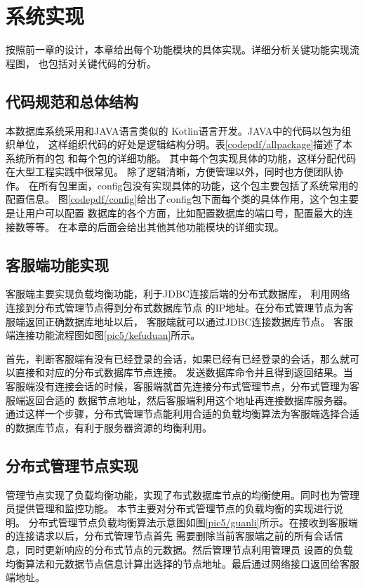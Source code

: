 
\chapter{系统实现}
按照前一章的设计，本章给出每个功能模块的具体实现。详细分析关键功能实现流程图，
也包括对关键代码的分析。
\section{代码规范和总体结构}
本数据库系统采用和JAVA语言类似的
Kotlin语言开发。JAVA中的代码以包为组织单位，
这样组织代码的好处是逻辑结构分明。表\ref{codepdf/allpackage}描述了本系统所有的包
和每个包的详细功能。
其中每个包实现具体的功能，这样分配代码在大型工程实践中很常见。
除了逻辑清晰，方便管理以外，同时也方便团队协作。
在所有包里面，config包没有实现具体的功能，这个包主要包括了系统常用的配置信息。
图\ref{codepdf/config}给出了config包下面每个类的具体作用，这个包主要是让用户可以配置
数据库的各个方面，比如配置数据库的端口号，配置最大的连接数等等。
在本章的后面会给出其他其他功能模块的详细实现。
\section{客服端功能实现}
客服端主要实现负载均衡功能，利于JDBC连接后端的分布式数据库，
利用网络连接到分布式管理节点得到分布式数据库节点
的IP地址。在分布式管理节点为客服端返回正确数据库地址以后，
客服端就可以通过JDBC连接数据库节点。
客服端连接功能流程图如图\ref{pic5/kefuduan}所示。

首先，判断客服端有没有已经登录的会话，如果已经有已经登录的会话，那么就可以直接和对应的分布式数据库节点连接。
发送数据库命令并且得到返回结果。当客服端没有连接会话的时候，客服端就首先连接分布式管理节点，分布式管理为客服端返回合适的
数据节点地址，然后客服端利用这个地址再连接数据库服务器。
通过这样一个步骤，分布式管理节点能利用合适的负载均衡算法为客服端选择合适的数据库节点，有利于服务器资源的均衡利用。
\section{分布式管理节点实现}
管理节点实现了负载均衡功能，实现了布式数据库节点的均衡使用。同时也为管理员提供管理和监控功能。
本节主要对分布式管理节点的负载均衡的实现进行说明。
分布式管理节点负载均衡算法示意图如图\ref{pic5/guanli}所示。在接收到客服端的连接请求以后，分布式管理节点首先
需要删除当前客服端之前的所有会话信息，同时更新响应的分布式节点的元数据。然后管理节点利用管理员
设置的负载均衡算法和元数据节点信息计算出选择的节点地址。最后通过网络接口返回给客服端地址。
